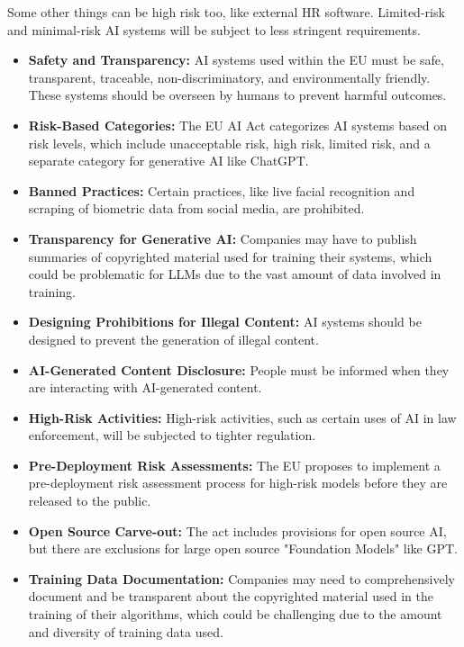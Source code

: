 Some other things can be high risk too, like external HR software. Limited-risk and minimal-risk AI systems will be subject to less stringent requirements. 
\begin{itemize}
  \item \textbf{Safety and Transparency:} AI systems used within the EU must be safe, transparent, traceable, non-discriminatory, and environmentally friendly. These systems should be overseen by humans to prevent harmful outcomes.
  \item \textbf{Risk-Based Categories:} The EU AI Act categorizes AI systems based on risk levels, which include unacceptable risk, high risk, limited risk, and a separate category for generative AI like ChatGPT.
  \item \textbf{Banned Practices:} Certain practices, like live facial recognition and scraping of biometric data from social media, are prohibited.
  \item \textbf{Transparency for Generative AI:} Companies may have to publish summaries of copyrighted material used for training their systems, which could be problematic for LLMs due to the vast amount of data involved in training.
  \item \textbf{Designing Prohibitions for Illegal Content:} AI systems should be designed to prevent the generation of illegal content.
  \item \textbf{AI-Generated Content Disclosure:} People must be informed when they are interacting with AI-generated content.
  \item \textbf{High-Risk Activities:} High-risk activities, such as certain uses of AI in law enforcement, will be subjected to tighter regulation.
  \item \textbf{Pre-Deployment Risk Assessments:} The EU proposes to implement a pre-deployment risk assessment process for high-risk models before they are released to the public.
  \item \textbf{Open Source Carve-out:} The act includes provisions for open source AI, but there are exclusions for large open source "Foundation Models" like GPT.
  \item \textbf{Training Data Documentation:} Companies may need to comprehensively document and be transparent about the copyrighted material used in the training of their algorithms, which could be challenging due to the amount and diversity of training data used.
\end{itemize}

